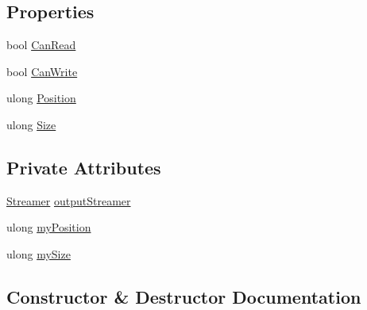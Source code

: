 \subsection*{Properties}
\begin{DoxyCompactItemize}
\item 
bool \hyperlink{class_e_l_i_client_1_1_output_video_stream_a1883b47d619f458147eff35edae0804f}{Can\+Read}
\item 
bool \hyperlink{class_e_l_i_client_1_1_output_video_stream_a1951c63319d5d5b92f99f33e099458b0}{Can\+Write}
\item 
ulong \hyperlink{class_e_l_i_client_1_1_output_video_stream_a456f195f5c5aa6908b4ece4eaa26706f}{Position}
\item 
ulong \hyperlink{class_e_l_i_client_1_1_output_video_stream_a1ccae6fdd1b9fddeba94de627d136ba4}{Size}
\end{DoxyCompactItemize}
\subsection*{Private Attributes}
\begin{DoxyCompactItemize}
\item 
\hyperlink{class_e_l_i_client_1_1_streamer}{Streamer} \hyperlink{class_e_l_i_client_1_1_output_video_stream_a8918d79717e23adce1a256845b9d61f3}{output\+Streamer}
\item 
ulong \hyperlink{class_e_l_i_client_1_1_output_video_stream_a62d450a2ca8641fd9ed775ce3309f04b}{my\+Position}
\item 
ulong \hyperlink{class_e_l_i_client_1_1_output_video_stream_a9262fa2c4cacb0e214b3bdc682c9a5c1}{my\+Size}
\end{DoxyCompactItemize}


\subsection{Constructor \& Destructor Documentation}
\mbox{\label{class_e_l_i_client_1_1_output_video_stream_ae53199f9aa8b56940a0d89b0de41b993}} 
